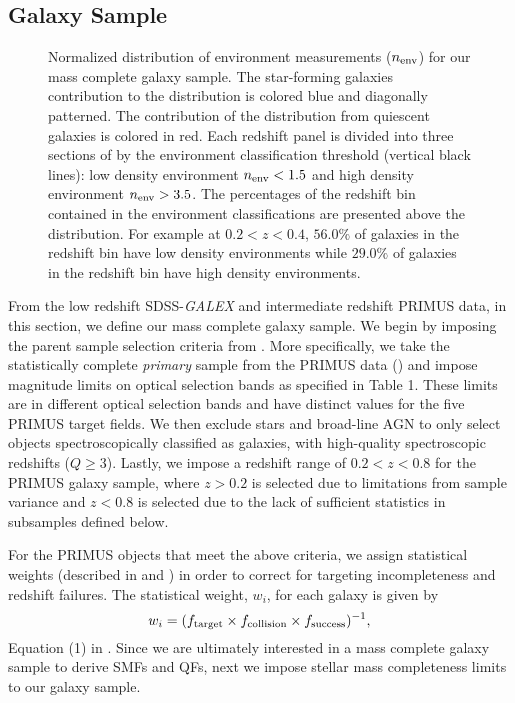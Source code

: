 \documentclass{emulateapj}
\begin{document}
\subsection{Galaxy Sample} \label{sec:target} 
\begin{figure*}
  \begin{center}
    \leavevmode
     \caption{Normalized distribution of environment measurements ($n_{\rm{env}}$) for our mass complete galaxy sample. The star-forming galaxies contribution to the distribution is colored blue and diagonally patterned. The contribution of the distribution from quiescent galaxies is colored in red. Each redshift panel is divided into three sections of by the environment classification threshold (vertical black lines): low density environment $n_{\rm{env}} < 1.5$ and high density environment $n_{\rm{env}} > 3.5$. The percentages of the redshift bin contained in the environment classifications are presented above the distribution. For example at $0.2 < z < 0.4$, $56.0 \%$ of galaxies in the redshift bin have low density environments while $29.0\%$ of galaxies in the redshift bin have high density environments. }      \label{fig:envcount}
    \end{center}
\end{figure*}

From the low redshift SDSS-{\em GALEX} and intermediate redshift PRIMUS data, in this section, we define our mass complete galaxy sample. We begin by imposing the parent sample selection criteria from \cite{Moustakas:2013aa}. More specifically, we take the statistically complete {\em primary} sample from the PRIMUS data (\cite{Coil:2011aa}) and impose magnitude limits on optical selection bands as specified in \cite{Moustakas:2013aa} Table 1. These limits are in different optical selection bands and have distinct values for the five PRIMUS target fields. We then exclude stars and broad-line AGN to only select objects spectroscopically classified as galaxies, with high-quality spectroscopic redshifts ($Q \geq 3$). Lastly, we impose a redshift range of $ 0.2 < z < 0.8$ for the PRIMUS galaxy sample, where $ z > 0.2$ is selected due to limitations from sample variance and $ z < 0.8$ is selected due to the lack of sufficient statistics in subsamples defined below. 

For the PRIMUS objects that meet the above criteria, we assign statistical weights (described in \cite{Coil:2011aa} and \cite{Cool:2013aa}) in order to correct for targeting incompleteness and redshift failures. The statistical weight, $w_i$, for each galaxy is given by
\begin{equation}
w_{i} = (f_{\rm{target}} \times f_{\rm{collision}} \times f_{\rm{success}})^{-1},
\end{equation}
Equation (1) in \cite{Moustakas:2013aa}. Since we are ultimately interested in a mass complete galaxy sample to derive SMFs and QFs, next we impose stellar mass completeness limits to our galaxy sample. 
\end{document}
